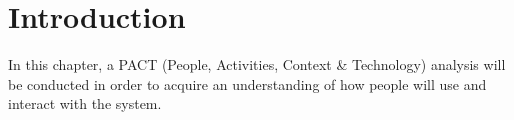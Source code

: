 \section{Introduction}
In this chapter, a PACT (People, Activities, Context \& Technology) analysis will be conducted in order to acquire an understanding of how people will use and interact with the system.